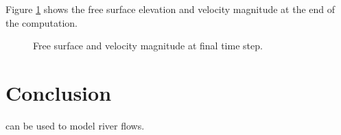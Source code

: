 Figure \ref{t2d:riogrande:FSVelo} shows the free surface elevation and velocity
magnitude at the end of the computation.

\begin{figure}[H]
\begin{minipage}[t]{0.5\textwidth}
 \centering
\end{minipage}
\begin{minipage}[t]{0.5\textwidth}
 \centering
\end{minipage}
\caption{Free surface and velocity magnitude at final time step.}
\label{t2d:riogrande:FSVelo}
\end{figure}

\section{Conclusion}

 can be used to model river flows.
